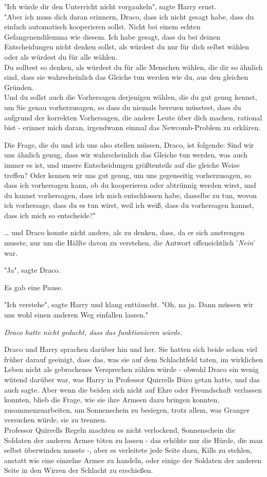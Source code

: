 {"Ich würde dir den Unterricht nicht vorgaukeln", sagte Harry ernst.\\ "Aber ich muss dich daran erinnern, Draco, dass ich nicht gesagt habe, dass du einfach automatisch kooperieren sollst. Nicht bei einem echten Gefangenendilemma wie diesem. Ich habe gesagt, dass du bei deinen Entscheidungen nicht denken sollst, als würdest du nur für dich selbst wählen oder als würdest du für alle wählen.\\ Du solltest so denken, als würdest du für alle Menschen wählen, die dir so ähnlich sind, dass sie wahrscheinlich das Gleiche tun werden wie du, aus den gleichen Gründen.\\ Und du sollst auch die Vorhersagen derjenigen wählen, die du gut genug kennst, um Sie genau vorherzusagen, so dass du niemals bereuen müsstest, dass du aufgrund der korrekten Vorhersagen, die andere Leute über dich machen, rational bist - erinner mich daran, irgendwann einmal das Newcomb-Problem zu erklären.

Die Frage, die du und ich uns also stellen müssen, Draco, ist folgende: Sind wir uns ähnlich genug, dass wir wahrscheinlich das Gleiche tun werden, was auch immer es ist, und unsere Entscheidungen größtenteils auf die gleiche Weise treffen? Oder kennen wir uns gut genug, um uns gegenseitig vorherzusagen, so dass ich vorhersagen kann, ob du kooperieren oder abtrünnig werden wirst, und du kannst vorhersagen, dass ich mich entschlossen habe, dasselbe zu tun, wovon ich vorhersage, dass du es tun wirst, weil ich weiß, dass du vorhersagen kannst, dass ich mich so entscheide?"

… und Draco konnte nicht anders, als zu denken, dass, da er sich anstrengen musste, nur um die Hälfte davon zu verstehen, die Antwort offensichtlich '\emph{Nein}' war.

"Ja", sagte Draco.

Es gab eine Pause.

"Ich verstehe", sagte Harry und klang enttäuscht. "Oh, na ja. Dann müssen wir uns wohl einen anderen Weg einfallen lassen."

\emph{Draco hatte nicht gedacht, dass das funktionieren würde.}

Draco und Harry sprachen darüber hin und her. Sie hatten sich beide schon viel früher darauf geeinigt, dass das, was sie auf dem Schlachtfeld taten, im wirklichen Leben nicht als gebrochenes Versprechen zählen würde - obwohl Draco ein wenig wütend darüber war, was Harry in Professor Quirrells Büro getan hatte, und das auch sagte. Aber wenn die beiden sich nicht auf Ehre oder Freundschaft verlassen konnten, blieb die Frage, wie sie ihre Armeen dazu bringen konnten, zusammenzuarbeiten, um Sonnenschein zu besiegen, trotz allem, was Granger versuchen würde, sie zu trennen.\\ Professor Quirrells Regeln machten es nicht verlockend, Sonnenschein die Soldaten der anderen Armee töten zu lassen - das erhöhte nur die Hürde, die man selbst überwinden musste -, aber es verleitete jede Seite dazu, Kills zu stehlen, anstatt wie eine einzelne Armee zu handeln, oder einige der Soldaten der anderen Seite in den Wirren der Schlacht zu erschießen.

}
